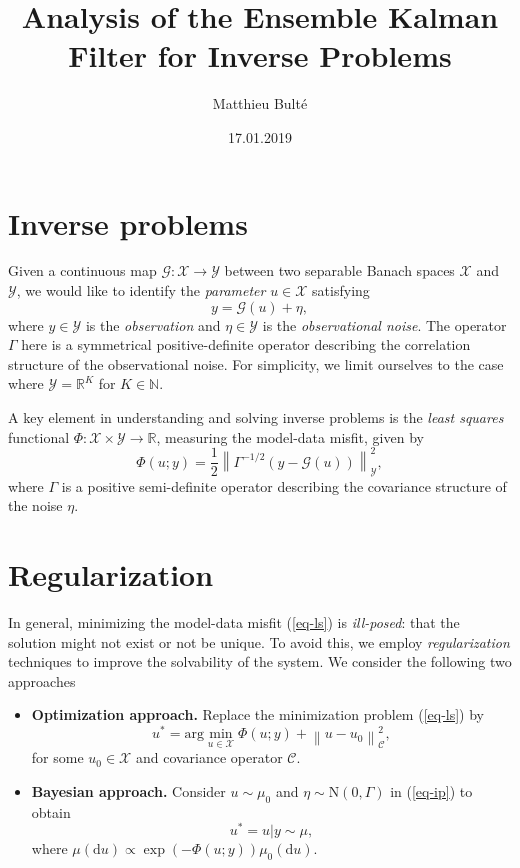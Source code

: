 \documentclass[10pt,a4paper]{article}
\newcommand{\norm}[1]{\left\lVert#1\right\rVert}
\begin{document}
\title{Analysis of the Ensemble Kalman Filter for Inverse Problems}
\author{Matthieu Bulté}
\date{17.01.2019}

\maketitle

\section*{Inverse problems}
Given a continuous map $\mathcal{G} : \mathcal{X} \rightarrow \mathcal{Y}$ between
two separable Banach spaces $\mathcal{X}$ and $\mathcal{Y}$, we would like to identify
the \textit{parameter} $u \in \mathcal{X}$ satisfying 
\begin{equation} \label{eq-ip}
    y = \mathcal{G}(u) + \eta, \tag{IP}
\end{equation}
where $y \in \mathcal{Y}$ is the \textit{observation} and $\eta \in \mathcal{Y}$ is the
\textit{observational noise}. The operator $\Gamma$ here is a symmetrical positive-definite
operator describing the correlation structure of the observational noise. For simplicity,
we limit ourselves to the case where $\mathcal{Y} = \mathbb{R}^K$ for $K \in \mathbb{N}$.

A key element in understanding and solving inverse problems is the \textit{least squares}
functional $\Phi : \mathcal{X} \times \mathcal{Y} \rightarrow \mathbb{R}$, measuring the
model-data misfit, given by
\begin{equation} \label{eq-ls}
    \Phi(u; y) = \frac12\norm{\Gamma^{-1/2}(y - \mathcal{G}(u))}_\mathcal{Y}^2, \tag{LS}
\end{equation}
where $\Gamma$ is a positive semi-definite operator describing the covariance structure
 of the noise $\eta$. 

 \section*{Regularization}
In general, minimizing the model-data misfit (\ref{eq-ls}) is \textit{ill-posed}: that the solution
might not exist or not be unique. To avoid this, we employ \textit{regularization}
techniques to improve the solvability of the system. We consider the following two
approaches
\begin{itemize}
    \item{\textbf{Optimization approach.}
    Replace the minimization problem (\ref{eq-ls}) by
    \begin{equation*}
        u^* = \text{arg}\min_{u \in \mathcal{X}} \Phi(u; y) + \norm{u - u_0}_\mathcal{C}^2,
    \end{equation*}
    for some $u_0 \in \mathcal{X}$ and covariance operator $\mathcal{C}$.
    }
    \item{\textbf{Bayesian approach.}
    Consider $u \sim \mu_0$ and $\eta \sim \text{N}(0, \Gamma)$ in (\ref{eq-ip}) to obtain
    \begin{equation*}
        u^* = u | y \sim \mu,
    \end{equation*}
    where $\mu(\text{d}u) \propto \exp(-\Phi(u; y))\mu_0(\text{d}u)$.}
\end{itemize}
\end{document}
